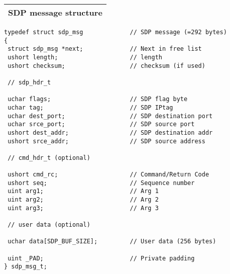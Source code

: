 \documentclass[11pt,a4paper,twoside]{article}
\begin{document}
\begin{center}
\renewcommand{\arraystretch}{1.2}
\begin{tabularx}{\textwidth}{| X |}
\hline
SDP message structure \\%
\hline
\end{tabularx}


\begin{minipage}{4.5in}
\begin{lstlisting}
typedef struct sdp_msg             // SDP message (=292 bytes)
{
 struct sdp_msg *next;             // Next in free list
 ushort length;                    // length
 ushort checksum;                  // checksum (if used)

 // sdp_hdr_t

 uchar flags;                      // SDP flag byte
 uchar tag;                        // SDP IPtag
 uchar dest_port;                  // SDP destination port
 uchar srce_port;                  // SDP source port
 ushort dest_addr;                 // SDP destination addr
 ushort srce_addr;                 // SDP source address

 // cmd_hdr_t (optional)

 ushort cmd_rc;                    // Command/Return Code
 ushort seq;                       // Sequence number
 uint arg1;                        // Arg 1
 uint arg2;                        // Arg 2
 uint arg3;                        // Arg 3

 // user data (optional)

 uchar data[SDP_BUF_SIZE];         // User data (256 bytes)

 uint _PAD;                        // Private padding
} sdp_msg_t;

\end{lstlisting}
\end{minipage}

\renewcommand{\arraystretch}{1.2}
\begin{tabularx}{\textwidth}{| X |}
\hline
 \\%
\hline
\end{tabularx}
\end{center}
\end{document}
